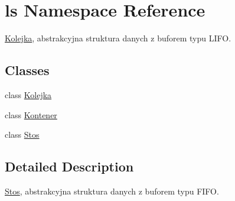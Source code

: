 \hypertarget{namespacels}{\section{ls Namespace Reference}
\label{namespacels}
}


\hyperlink{classls_1_1_kolejka}{Kolejka}, abstrakcyjna struktura danych z buforem typu L\-I\-F\-O.  


\subsection*{Classes}
\begin{DoxyCompactItemize}
\item 
class \hyperlink{classls_1_1_kolejka}{Kolejka}
\item 
class \hyperlink{classls_1_1_kontener}{Kontener}
\item 
class \hyperlink{classls_1_1_stos}{Stos}
\end{DoxyCompactItemize}


\subsection{Detailed Description}
\hyperlink{classls_1_1_stos}{Stos}, abstrakcyjna struktura danych z buforem typu F\-I\-F\-O. 